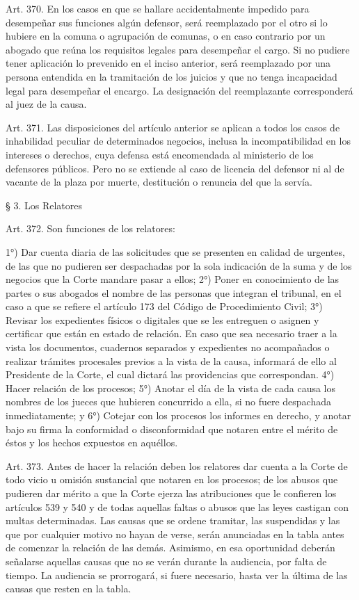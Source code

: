     Art. 370. En los casos en que se hallare accidentalmente impedido para desempeñar sus funciones algún defensor, será reemplazado por el otro si lo hubiere en la comuna o agrupación de comunas, o en caso contrario por un abogado que reúna los requisitos legales para desempeñar el cargo.
    Si no pudiere tener aplicación lo prevenido en el inciso anterior, será reemplazado por una persona entendida en la tramitación de los juicios y que no tenga incapacidad legal para desempeñar el encargo.
    La designación del reemplazante corresponderá al juez de la causa.


    Art. 371. Las disposiciones del artículo anterior se aplican a todos los casos de inhabilidad peculiar de determinados negocios, inclusa la incompatibilidad en los intereses o derechos, cuya defensa está encomendada al ministerio de los defensores públicos.
    Pero no se extiende al caso de licencia del defensor ni al de vacante de la plaza por muerte, destitución o renuncia del que la servía.

    § 3. Los Relatores


    Art. 372. Son funciones de los relatores:

    1°) Dar cuenta diaria de las solicitudes que se presenten en calidad de urgentes, de las que no pudieren ser despachadas por la sola indicación de la suma y de los negocios que la Corte mandare pasar a ellos;
    2°) Poner en conocimiento de las partes o sus abogados el nombre de las personas que integran el tribunal, en el caso a que se refiere el artículo 173 del Código de Procedimiento Civil;
    3°) Revisar los expedientes físicos o digitales que se les entreguen o asignen y certificar que están en estado de relación. En caso que sea necesario traer a la vista los documentos, cuadernos separados y expedientes no acompañados o realizar trámites procesales previos a la vista de la causa, informará de ello al Presidente de la Corte, el cual dictará las providencias que correspondan.
    4°) Hacer relación de los procesos;
    5°) Anotar el día de la vista de cada causa los nombres de los jueces que hubieren concurrido a ella, si no fuere despachada inmediatamente; y
    6°) Cotejar con los procesos los informes en derecho, y anotar bajo su firma la conformidad o disconformidad que notaren entre el mérito de éstos y los hechos expuestos en aquéllos.



    Art. 373. Antes de hacer la relación deben los relatores dar cuenta a la Corte de todo vicio u omisión sustancial que notaren en los procesos; de los abusos que pudieren dar mérito a que la Corte ejerza las atribuciones que le confieren los artículos 539 y 540 y de todas aquellas faltas o abusos que las leyes castigan con multas determinadas.
    Las causas que se ordene tramitar, las suspendidas y las que por cualquier motivo no hayan de verse, serán anunciadas en la tabla antes de comenzar la relación de las demás. Asimismo, en esa oportunidad deberán señalarse aquellas causas que no se verán durante la audiencia, por falta de tiempo. La audiencia se prorrogará, si fuere necesario, hasta ver la última de las causas que resten en la tabla.


